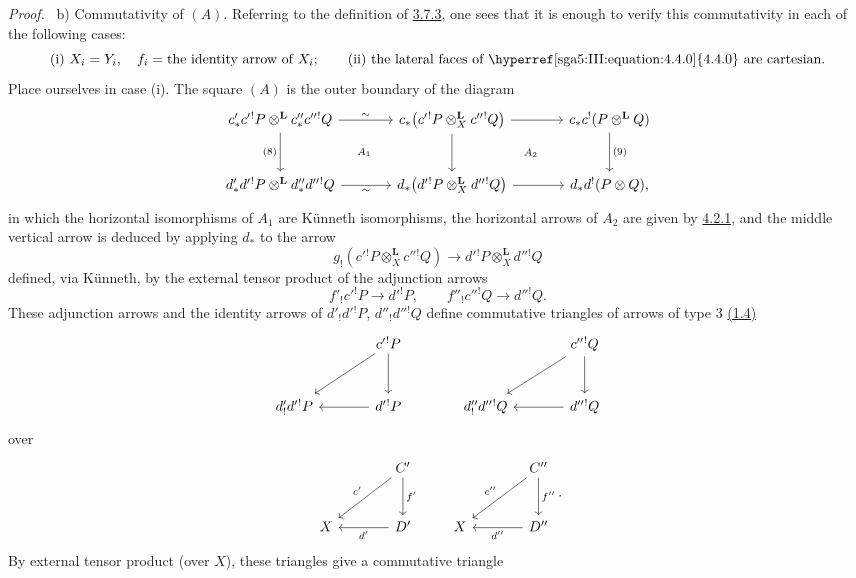 \documentclass[11pt]{article}
\newenvironment{prooftext}[1][Proof]{\par\noindent\emph{#1.}\ }{\par\medskip}
\begin{document}
\begin{prooftext}[Proof]
b) Commutativity of $(A)$. Referring to the definition of \hyperref[sga5:III:equation:3.7.3]{3.7.3}, one sees that it is enough to verify this commutativity in each of the following cases:
\[
\text{(i) } X_i=Y_i,\quad f_i=\text{the identity arrow of }X_i;\qquad
\text{(ii) the lateral faces of \hyperref[sga5:III:equation:4.4.0]{4.4.0} are cartesian.}
\]
Place ourselves in case (i). The square $(A)$ is the outer boundary of the diagram
\[
\begin{tikzcd}[column sep=large,row sep=large]
c'_*c'{}^!P\otimes^{\mathbf L}c''_*c''{}^!Q
 \arrow[r,"\sim"] \arrow[d,"(8)"'] &
c_*\bigl(c'{}^!P\otimes_X^{\mathbf L}c''{}^!Q\bigr)
 \arrow[r] \arrow[d] &
c_*c^!(P\otimes^{\mathbf L}Q)\arrow[d,"(9)"]\\
d'_*d'{}^!P\otimes^{\mathbf L}d''_*d''{}^!Q
 \arrow[r,"\sim"'] &
d_*\bigl(d'{}^!P\otimes_X^{\mathbf L}d''{}^!Q\bigr)
 \arrow[r] &
d_*d^!(P\otimes Q),
\arrow[from=1-1,to=2-2,phantom,"\scriptstyle A_1"]
\arrow[from=1-2,to=2-3,phantom,"\scriptstyle A_2"]
\end{tikzcd}
\]
in which the horizontal isomorphisms of $A_1$ are Künneth isomorphisms, the horizontal arrows of $A_2$ are given by \hyperref[sga5:III:equation:4.2.1]{4.2.1}, and the middle vertical arrow is deduced by applying $d_*$ to the arrow
\[
g_!(c'{}^!P\otimes_X^{\mathbf L}c''{}^!Q)\longrightarrow d'{}^!P\otimes_X^{\mathbf L}d''{}^!Q
\]
defined, via Künneth, by the external tensor product of the adjunction arrows
\[
f'_!c'{}^!P\longrightarrow d'{}^!P,\qquad
f''_!c''{}^!Q\longrightarrow d''{}^!Q.
\]
These adjunction arrows and the identity arrows of $d'_!d'{}^!P$, $d''_!d''{}^!Q$ define commutative triangles of arrows of type $3$ \hyperref[sga5:III:subsection:1.4]{(1.4)}
\[
\begin{tikzcd}[column sep=large,row sep=large]
& c'{}^!P \arrow[d] \arrow[dl] & & c''{}^!Q \arrow[d]\arrow[dl]\\
d'_!d'{}^!P & d'{}^!P\arrow[l] & d''_!d''{}^!Q & d''{}^!Q\arrow[l]
\end{tikzcd}
\]
over
\[
\begin{tikzcd}[column sep=large,row sep=large]
& C' \arrow[d,"f'"] \arrow[dl,"c'"']\\
X & D'\arrow[l,"d'"]
\end{tikzcd}
\qquad
\begin{tikzcd}[column sep=large,row sep=large]
& C'' \arrow[d,"f''"] \arrow[dl,"c''"']\\
X & D''\arrow[l,"d''"]
\end{tikzcd}.
\]
By external tensor product (over $X$), these triangles give a commutative triangle

\end{prooftext}
\end{document}
